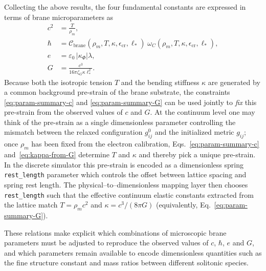 Collecting the above results, the four fundamental constants are expressed in terms of brane microparameters as
%
\begin{align}
  c^2 &= \frac{T}{\rho_m},
  \label{eq:param-summary-c}
  \\
  \hbar &= \mathcal{C}_{\mathrm{brane}}(\rho_m, T, \kappa, \epsilon_{\mathrm{cr}}, \ell_\ast)\;
           \omega_C(\rho_m, T, \kappa, \epsilon_{\mathrm{cr}}, \ell_\ast),
  \label{eq:param-summary-hbar}
  \\
  e &= \varepsilon_0\,|\kappa_{\Phi}| \lambda,
  \label{eq:param-summary-e}
  \\
  G &= \frac{c^3}{16\pi \zeta_G \kappa \ell_\ast^2}.
  \label{eq:param-summary-G}
\end{align}
%
Because both the isotropic tension $T$ and the bending stiffness $\kappa$
are generated by a common background pre-strain of the brane substrate,
the constraints \eqref{eq:param-summary-c} and \eqref{eq:param-summary-G}
can be used jointly to \emph{fix} this pre-strain from the observed values
of $c$ and $G$.
At the continuum level one may think of the pre-strain as a single
dimensionless parameter controlling the mismatch between the relaxed
configuration $g^0_{ij}$ and the initialized metric $g_{ij}$; once
$\rho_m$ has been fixed from the electron calibration, Eqs.~\eqref{eq:param-summary-c}
and~\eqref{eq:kappa-from-G} determine $T$ and $\kappa$ and thereby pick
a unique pre-strain.
In the discrete simulator this pre-strain is encoded as a dimensionless
spring \texttt{rest\_length} parameter which controls the offset between
lattice spacing and spring rest length.
The physical--to--dimensionless mapping layer then chooses \texttt{rest\_length}
such that the effective continuum elastic constants extracted from the
lattice match $T = \rho_m c^2$ and $\kappa = c^3/(8\pi G)$ (equivalently,
Eq.~\eqref{eq:param-summary-G}).

These relations make explicit which combinations of microscopic brane parameters must be adjusted to reproduce the observed values of $c$, $\hbar$, $e$ and $G$, and which parameters remain available to encode dimensionless quantities such as the fine structure constant and mass ratios between different solitonic species.

